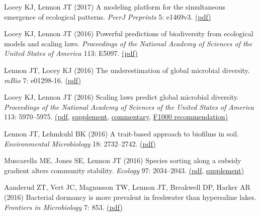 \documentclass[11pt]{article}
\begin{document}
\begin{etaremune}
\item Locey KJ, Lennon JT (2017) A modeling platform for the simultaneous emergence of ecological patterns. \textit{PeerJ Preprints} 5: e1469v3. \href{https://lennonlab.github.io/assets/publications/Locey_Lennon_2017.pdf}{(pdf)}

\item Locey KJ, Lennon JT (2016) Powerful predictions of biodiversity from ecological models and scaling laws. \textit{Proceedings of the National Academy of Sciences of the United States of America} 113: E5097. \href{https://lennonlab.github.io/assets/publications/Locey_Lennon_2016_Reply.pdf}{(pdf)}

\item Lennon JT, Locey KJ (2016) The underestimation of global microbial diversity. \textit{mBio} 7: e01298-16. \href{https://lennonlab.github.io/assets/publications/Lennon_Locey_2016_mBio.pdf}{(pdf)}

\item Locey KJ, Lennon JT (2016) Scaling laws predict global microbial diversity. \textit{Proceedings of the National Academy of Sciences of the United States of America} 113: 5970–5975. \href{https://lennonlab.github.io/assets/publications/Locey_Lennon_2016.pdf}{(pdf}, \href{https://lennonlab.github.io/assets/publications/Locey_Lennon_2016_SI.pdf}{supplement}, \href{https://lennonlab.github.io/assets/publications/Pedros-Alio_Manrubia_2016.pdf}{commentary}, \href{https://f1000.com/prime/726327633}{F1000 recommendation)}

\item Lennon JT, Lehmkuhl BK (2016) A trait-based approach to biofilms in soil. \textit{Environmental Microbiology} 18: 2732–2742. \href{https://lennonlab.github.io/assets/publications/Lennon_Lehmkuhl_2016.pdf}{(pdf)}

\item Muscarella ME, Jones SE, Lennon JT (2016) Species sorting along a subsidy gradient alters community stability. \textit{Ecology} 97: 2034–2043. \href{https://lennonlab.github.io/assets/publications/Muscarella_etal_2016.pdf}{(pdf}, \href{https://lennonlab.github.io/assets/publications/Muscarella_etal_Supplement_2016.pdf}{supplement)}

\item Aanderud ZT, Vert JC, Magnusson TW, Lennon JT, Breakwell DP, Harker AR (2016) Bacterial dormancy is more prevalent in freshwater than hypersaline lakes. \textit{Frontiers in Microbiology} 7: 853. \href{https://lennonlab.github.io/assets/publications/Aanderud_etal_2016.pdf}{(pdf)}


\end{etaremune}
\end{document}
